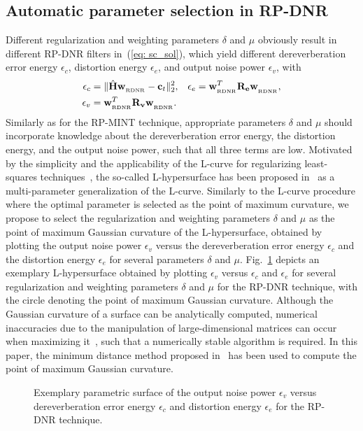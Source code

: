 \documentclass[draftcls,onecolumn,11pt]{IEEEtran}
\begin{document}
\subsection{Automatic parameter selection in RP-DNR}
\label{sec: auto_rp}
Different regularization and weighting parameters $\delta$ and $\mu$ obviously result in different RP-DNR filters in~(\ref{eq: sc_sol}), which yield different dereverberation error energy $\epsilon_{c}$, distortion energy $\epsilon_{e}$, and output noise power $\epsilon_{v}$, with
\begin{align}
  \epsilon_c & = \|\hat{\mathbf{H}} \mathbf{w}_{_{\rm RDNR}} -\mathbf{c}_t \|_2^2, \; \; \; \epsilon_e  = \mathbf{w}^T_{_{\rm RDNR}}\mathbf{R}_{\mathbf{e}}\mathbf{w}^{}_{_{\rm RDNR}},  \\
  \epsilon_v &= \mathbf{w}^T_{_{\rm RDNR}} \mathbf{R}_{\mathbf{v}}\mathbf{w}^{}_{_{\rm RDNR}}.
\end{align}
Similarly as for the RP-MINT technique, appropriate parameters $\delta$ and $\mu$ should incorporate knowledge about the dereverberation error energy, the distortion energy, and the output noise power, such that all three terms are low.
Motivated by the simplicity and the applicability of the L-curve for regularizing least-squares techniques~\cite{Hansen_1993}, the so-called L-hypersurface has been proposed in~\cite{Belge_SPIE_1998} as a multi-parameter generalization of the L-curve. 
Similarly to the L-curve procedure where the optimal parameter is selected as the point of maximum curvature, we propose to select the regularization and weighting parameters $\delta$ and $\mu$ as the point of maximum Gaussian curvature of the L-hypersurface, obtained by plotting the output noise power $\epsilon_v$ versus the dereverberation error energy $\epsilon_c$ and the distortion energy $\epsilon_e$ for several parameters $\delta$ and $\mu$.
Fig.~\ref{fig: L3} depicts an exemplary L-hypersurface obtained by plotting $\epsilon_{v}$ versus $\epsilon_c$ and $\epsilon_e$ for several regularization and weighting parameters $\delta$ and $\mu$ for the RP-DNR technique, with the circle denoting the point of maximum Gaussian curvature.
Although the Gaussian curvature of a surface can be analytically computed, numerical inaccuracies due to the manipulation of large-dimensional matrices can occur when maximizing it~\cite{Belge_IP_2002}, such that a numerically stable algorithm is required.
In this paper, the minimum distance method proposed in~\cite{Belge_IP_2002} has been used to compute the point of maximum Gaussian curvature. 
\begin{figure}[t!]
\centering

\caption{Exemplary parametric surface of the output noise power $\epsilon_v$ versus dereverberation error energy $\epsilon_c$ and distortion energy $\epsilon_e$ for the RP-DNR technique.}
\label{fig: L3}
\end{figure}
\end{document}
